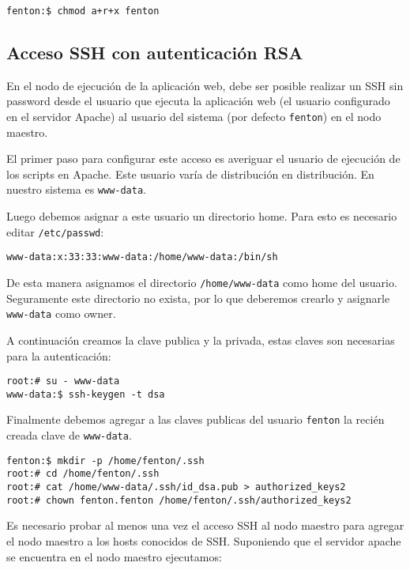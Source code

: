 \documentclass[a4paper,10pt,spanish]{article}
\begin{document}
\begin{verbatim}
fenton:$ chmod a+r+x fenton
\end{verbatim}

\subsection{Acceso SSH con autenticaci\'{o}n RSA}

En el nodo de ejecuci\'{o}n de la aplicaci\'{o}n web, debe ser posible realizar un SSH sin password desde el usuario que ejecuta la aplicaci\'{o}n web (el usuario configurado en el servidor Apache) al usuario del sistema (por defecto \mbox{\texttt{fenton}}) en el nodo maestro. 

El primer paso para configurar este acceso es averiguar el usuario de ejecuci\'{o}n de los scripts en Apache. Este usuario var\'{i}a de distribuci\'{o}n en distribuci\'{o}n. En nuestro sistema es \mbox{\texttt{www-data}}.

Luego debemos asignar a este usuario un directorio home. Para esto es necesario editar \mbox{\texttt{/etc/passwd}}:

\begin{verbatim}
www-data:x:33:33:www-data:/home/www-data:/bin/sh
\end{verbatim}

De esta manera asignamos el directorio \mbox{\texttt{/home/www-data}} como home del usuario. Seguramente este directorio no exista, por lo que deberemos crearlo y asignarle \mbox{\texttt{www-data}} como owner.

A continuaci\'{o}n creamos la clave publica y la privada, estas claves son necesarias para la autenticaci\'{o}n:

\begin{verbatim}
root:# su - www-data
www-data:$ ssh-keygen -t dsa
\end{verbatim}

Finalmente debemos agregar a las claves publicas del usuario \mbox{\texttt{fenton}} la reci\'{e}n creada clave de \mbox{\texttt{www-data}}.

\begin{verbatim}
fenton:$ mkdir -p /home/fenton/.ssh
root:# cd /home/fenton/.ssh
root:# cat /home/www-data/.ssh/id_dsa.pub > authorized_keys2
root:# chown fenton.fenton /home/fenton/.ssh/authorized_keys2
\end{verbatim}

Es necesario probar al menos una vez el acceso SSH al nodo maestro para agregar el nodo maestro a los hosts conocidos de SSH. Suponiendo que el servidor apache se encuentra en el nodo maestro ejecutamos:
\end{document}
